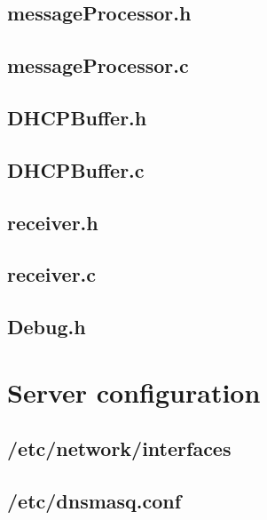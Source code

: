 \documentclass[11pt,a4paper]{scrartcl}
\begin{document}
\subsection{messageProcessor.h}


\subsection{messageProcessor.c}


\subsection{DHCPBuffer.h}


\subsection{DHCPBuffer.c}


\subsection{receiver.h}


\subsection{receiver.c}


\subsection{Debug.h}


\section{Server configuration} \label{app:serverconfig}
\subsection{/etc/network/interfaces}


\subsection{/etc/dnsmasq.conf}

\end{document}
